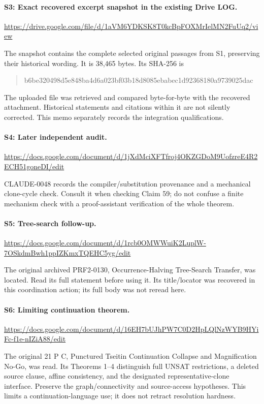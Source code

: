 \documentclass[11pt]{article}
\begin{document}
\paragraph{S3: Exact recovered excerpt snapshot in the existing Drive LOG.}
\url{https://drive.google.com/file/d/1aVM6YDKSK8T0kcBpFOXMrIelMN2FuUq2/view}

The snapshot contains the complete selected original passages from S1, preserving their historical wording. It is 38,465 bytes. Its SHA-256 is
\begin{quote}\small\ttfamily
b6be320498d5e848ba4d6a023bf03b18d8085ebabec1d92368180a9739025dac
\end{quote}
The uploaded file was retrieved and compared byte-for-byte with the recovered attachment. Historical statements and citations within it are not silently corrected. This memo separately records the integration qualifications.

\paragraph{S4: Later independent audit.}
\url{https://docs.google.com/document/d/1jXdMciXFTfroj4OKZGDoM9UofzreE4R2ECH51goneDI/edit}

CLAUDE-0048 records the compiler/substitution provenance and a mechanical clone-cycle check. Consult it when checking Claim 59; do not confuse a finite mechanism check with a proof-assistant verification of the whole theorem.

\paragraph{S5: Tree-search follow-up.}
\url{https://docs.google.com/document/d/1rcb0OMWWuiK2LuplW-7OSkdmBwh1ppIZKmxTQEHC5yg/edit}

The original archived PRF2-0130, Occurrence-Halving Tree-Search Transfer, was located. Read its full statement before using it. Its title/locator was recovered in this coordination action; its full body was not reread here.

\paragraph{S6: Limiting continuation theorem.}
\url{https://docs.google.com/document/d/16EH7bUJhPW7C0D2HpLQlNzWYB9HYiFc-f1e-nIZiA88/edit}

The original 21 P C, Punctured Tseitin Continuation Collapse and Magnification No-Go, was read. Its Theorems 1--4 distinguish full UNSAT restrictions, a deleted source clause, affine consistency, and the designated representative-clone interface. Preserve the graph/connectivity and source-access hypotheses. This limits a continuation-language use; it does not retract resolution hardness.
\end{document}
